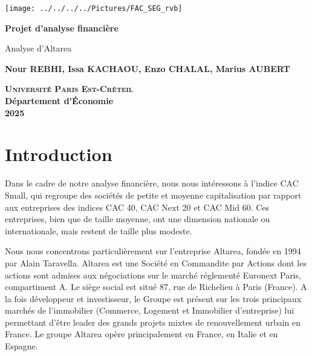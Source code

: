 \documentclass[a4paper, 12pt]{report}
\begin{document}
\begin{titlepage}
	\centering
	\begin{center}
		\texttt{[image: ../../../../Pictures/FAC\_SEG\_rvb]}
	\end{center}
	\vspace*{2cm}
	
	\Huge
	
	\textbf{Projet d'analyse financière}
	\vspace{1.5cm}
	
	\Large
Analyse d'Altarea
	
	\vspace{2cm}
	
	\textbf{Nour REBHI, Issa KACHAOU, Enzo CHALAL, Marius AUBERT} \\

	
	
	\vfill
	
	\Large
	
	\textsc{\textbf{Université Paris Est-Créteil}}	 \\
	\textbf{Département d'\'Economie} \\
	\textbf{2025}
	
\end{titlepage}
\thispagestyle{empty}
\newpage
\clearpage
\mbox{}
\thispagestyle{empty}

\tableofcontents

\thispagestyle{empty}
\newpage
\mbox{}
\thispagestyle{empty} %
\chapter*{Introduction}
\noindent
Dans le cadre de notre analyse financière, nous nous intéressons à l'indice CAC Small, qui regroupe des sociétés de petite et moyenne capitalisation par rapport aux entreprises des indices CAC 40, CAC Next 20 et CAC Mid 60. Ces entreprises, bien que de taille moyenne, ont une dimension nationale ou internationale, mais restent de taille plus modeste.

Nous nous concentrons particulièrement sur l'entreprise Altarea, fondée en 1994 par Alain Taravella. Altarea est une Société en Commandite par Actions dont les actions sont admises aux négociations sur le marché réglementé Euronext Paris, compartiment A. Le siège social est situé 87, rue de Richelieu à Paris (France). A la fois développeur et investisseur, le Groupe est présent sur les trois principaux marchés de l'immobilier (Commerce, Logement et Immobilier d'entreprise) lui permettant d'être leader des grands projets mixtes de renouvellement urbain en France. Le groupe Altarea opère principalement en France, en Italie et en Espagne.
\end{document}
